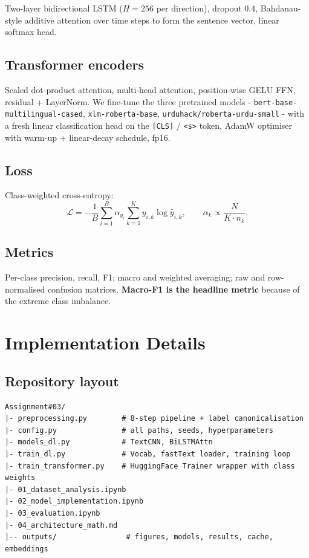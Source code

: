 \documentclass[
  english,
  11pt,
]{article}
\begin{document}
Two-layer bidirectional LSTM (\(H = 256\) per direction), dropout 0.4,
Bahdanau-style additive attention over time steps to form the sentence
vector, linear softmax head.

\subsection{Transformer encoders}\label{transformer-encoders}

Scaled dot-product attention, multi-head attention, position-wise GELU
FFN, residual + LayerNorm. We fine-tune the three pretrained models -
\texttt{bert-base-multilingual-cased}, \texttt{xlm-roberta-base},
\texttt{urduhack/roberta-urdu-small} - with a fresh linear
classification head on the \texttt{{[}CLS{]}} /
\texttt{\textless{}s\textgreater{}} token, AdamW optimiser with warm-up
+ linear-decay schedule, fp16.

\subsection{Loss}\label{loss}

Class-weighted cross-entropy: \[
\mathcal{L} = -\frac{1}{B}\sum_{i=1}^{B}\alpha_{y_i}\sum_{k=1}^{K} y_{i,k}\log\hat{y}_{i,k},
\qquad \alpha_k \propto \frac{N}{K\cdot n_k}.
\]

\subsection{Metrics}\label{metrics}

Per-class precision, recall, F1; macro and weighted averaging; raw and
row-normalised confusion matrices. \textbf{Macro-F1 is the headline
metric} because of the extreme class imbalance.

\section{Implementation Details}\label{implementation-details}

\subsection{Repository layout}\label{repository-layout}

\begin{verbatim}
Assignment#03/
|- preprocessing.py        # 8-step pipeline + label canonicalisation
|- config.py               # all paths, seeds, hyperparameters
|- models_dl.py            # TextCNN, BiLSTMAttn
|- train_dl.py             # Vocab, fastText loader, training loop
|- train_transformer.py    # HuggingFace Trainer wrapper with class weights
|- 01_dataset_analysis.ipynb
|- 02_model_implementation.ipynb
|- 03_evaluation.ipynb
|- 04_architecture_math.md
|-- outputs/                # figures, models, results, cache, embeddings
\end{verbatim}
\end{document}
